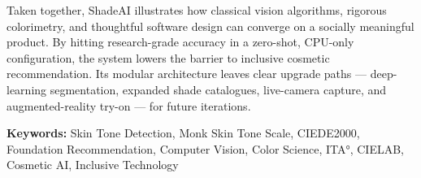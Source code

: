 \vspace{0.5cm}

Taken together, ShadeAI illustrates how classical vision algorithms, rigorous colorimetry, and thoughtful software design can converge on a socially meaningful product. By hitting research-grade accuracy in a zero-shot, CPU-only configuration, the system lowers the barrier to inclusive cosmetic recommendation. Its modular architecture leaves clear upgrade paths — deep-learning segmentation, expanded shade catalogues, live-camera capture, and augmented-reality try-on — for future iterations.

\vspace{0.5cm}

\textbf{Keywords:} Skin Tone Detection, Monk Skin Tone Scale, CIEDE2000, Foundation Recommendation, Computer Vision, Color Science, ITA°, CIELAB, Cosmetic AI, Inclusive Technology
